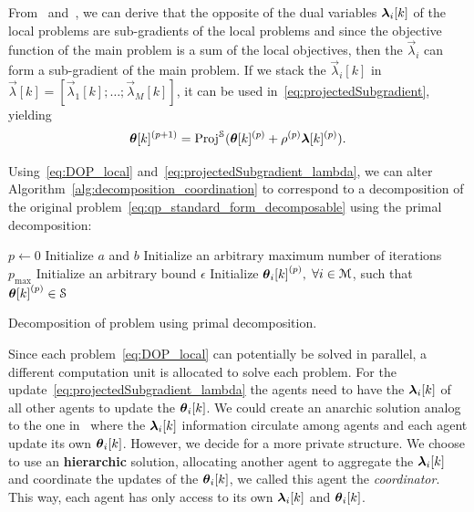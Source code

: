 \documentclass[../main.tex]{subfiles}
\begin{document}
From~\cite{BoydVandenberghe2004} and~\cite{BoydEtAl2015}, we can derive that the opposite of the dual variables $\lambdaik$ of the local problems are sub-gradients of the local problems and since the objective function of the main problem is a sum of the local objectives, then the $\vec{\lambda}_{i}$ can form a sub-gradient of the main problem.
If we stack the $\vec{\lambda}_{i}[k]$ in $\vec{\lambda}[k]=[\vec{\lambda}_{1}[k];\dots;\vec{\lambda}_{M}[k]]$, it can be used in~\eqref{eq:projectedSubgradient}, yielding
\begin{equation}
  \label{eq:projectedSubgradient_lambda}
  \boldsymbol{\theta}[k]^{(p+1)}=\operatorname{Proj}^{\mathcal{S}}(\boldsymbol{\theta}[k]^{(p)}+\rho^{(p)}\boldsymbol{\lambda}[k]^{(p)}).
\end{equation}

Using~\eqref{eq:DOP_local} and~\eqref{eq:projectedSubgradient_lambda}, we can alter Algorithm~\ref{alg:decomposition_coordination} to correspond to a decomposition of the original \mpc{} problem~\eqref{eq:qp_standard_form_decomposable} using the primal decomposition:
\begin{algorithm2e}[h]
  \DontPrintSemicolon%
  $p\gets 0$\;
  Initialize $a$ and $b$\;
  Initialize an arbitrary maximum number of iterations $p_{\max}$\;
  Initialize an arbitrary bound $\epsilon$\;
  Initialize ${\thetaik}^{(p)},$ $\forall i\in\mathcal{M}$, such that ${\boldsymbol{\theta}[k]}^{(p)}\in\mathcal{S}$\;
  \caption{Decomposition of \mpc{} problem using primal decomposition.}\label{alg:primal_decomposition}
\end{algorithm2e}

Since each problem~\eqref{eq:DOP_local} can potentially be solved in parallel, a different computation unit is allocated to solve each problem.
For the update~\eqref{eq:projectedSubgradient_lambda} the agents need to have the $\lambdaik$ of all other agents to update the $\thetaik$.
We could create an anarchic solution analog to the one in~\cite{VelardeEtAl2018} where the $\lambdaik$ information circulate among agents and each agent update its own $\thetaik$.
However, we decide for a more private structure.
We choose to use an \textbf{hierarchic} solution, allocating another agent to aggregate the $\lambdaik$ and coordinate the updates of the $\thetaik$, we called this agent the \emph{coordinator}.
This way, each agent has only access to its own $\lambdaik$ and $\thetaik$.
\end{document}
